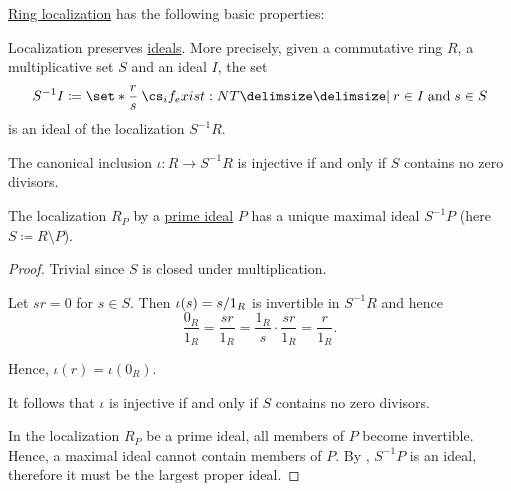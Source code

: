 \begin{proposition}\label{thm:def:ring_localization/properties}
  \hyperref[def:ring_localization]{Ring localization} has the following basic properties:

  \begin{thmenum}
     Localization preserves \hyperref[def:semiring_ideal]{ideals}. More precisely, given a commutative ring \( R \), a multiplicative set \( S \) and an ideal \( I \), the set
    \begin{equation*}
      S^{-1} I \coloneqq \set*{ \frac r s \given* r \in I \T{and} s \in S }
    \end{equation*}
    is an ideal of the localization \( S^{-1} R \).

     The canonical inclusion \( \iota: R \to S^{-1} R \) is injective if and only if \( S \) contains no zero divisors.

     The localization \( R_P \) by a \hyperref[def:semiring_ideal/prime]{prime ideal} \( P \) has a unique maximal ideal \( S^{-1} P \) (here \( S \coloneqq R \setminus P \)).
  \end{thmenum}
\end{proposition}
\begin{proof}
   Trivial since \( S \) is closed under multiplication.

   Let \( sr = 0 \) for \( s \in S \). Then \( \iota(s) = s / 1_R \) is invertible in \( S^{-1} R \) and hence
  \begin{equation*}
    \frac {0_R} {1_R}
    =
    \frac {sr} {1_R}
    =
    \frac {1_R} s \cdot \frac {sr} {1_R}
    =
    \frac r {1_R}.
  \end{equation*}

  Hence, \( \iota(r) = \iota(0_R) \).

  It follows that \( \iota \) is injective if and only if \( S \) contains no zero divisors.

   In the localization \( R_P \) be a prime ideal, all members of \( P \) become invertible. Hence, a maximal ideal cannot contain members of \( P \). By , \( S^{-1} P \) is an ideal, therefore it must be the largest proper ideal.
\end{proof}

